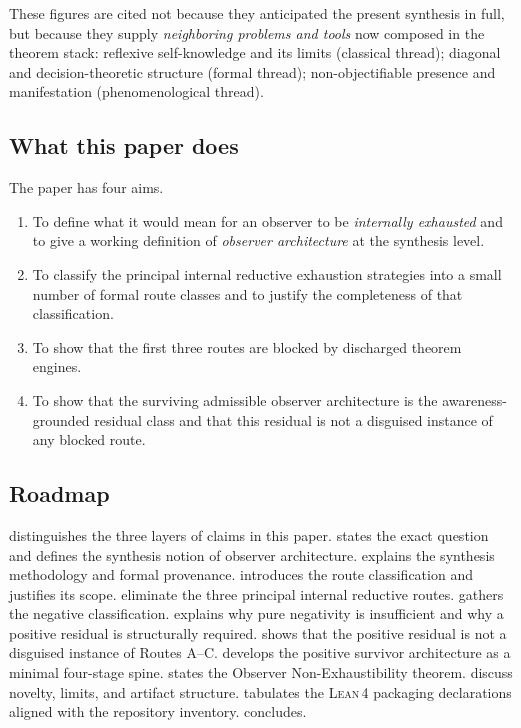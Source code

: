 \documentclass[11pt]{article}
\theoremstyle{plain}
\theoremstyle{definition}
\theoremstyle{remark}
\newcommand{\Lean}{\textsc{Lean\,4}}
\begin{document}
These figures are cited not because they anticipated the present synthesis
in full, but because they supply \emph{neighboring problems and tools} now
composed in the theorem stack: reflexive self-knowledge and its limits
(classical thread); diagonal and decision-theoretic structure (formal
thread); non-objectifiable presence and manifestation (phenomenological
thread).

\subsection*{What this paper does}

The paper has four aims.
\begin{enumerate}[label=(\arabic*),leftmargin=2.2em]
\item To define what it would mean for an observer to be \emph{internally
      exhausted} and to give a working definition of \emph{observer
      architecture} at the synthesis level.
\item To classify the principal internal reductive exhaustion strategies
      into a small number of formal route classes and to justify the
      completeness of that classification.
\item To show that the first three routes are blocked by discharged
      theorem engines.
\item To show that the surviving admissible observer architecture is the
      awareness-grounded residual class and that this residual is not a
      disguised instance of any blocked route.
\end{enumerate}

\subsection*{Roadmap}

 distinguishes the three layers of claims in this paper.
 states the exact question and defines the synthesis
notion of observer architecture.
 explains the synthesis methodology and formal
provenance.   introduces the route classification and
justifies its scope.   eliminate
the three principal internal reductive routes.  
gathers the negative classification.   explains why pure
negativity is insufficient and why a positive residual is structurally
required.   shows that the positive residual is
not a disguised instance of Routes A--C.
 develops the positive survivor architecture as a minimal
four-stage spine.   states the Observer Non-Exhaustibility
theorem.   discuss novelty,
limits, and artifact structure.   tabulates the
\Lean{} packaging declarations aligned with the repository inventory.
 concludes.
\end{document}
